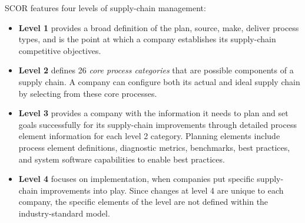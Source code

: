 \documentclass[11pt,a4paper]{article}
\begin{document}
SCOR features four levels of supply-chain management:
\begin{itemize}
\item \textbf{Level 1} provides a broad definition of the plan, source, make,
  deliver process types, and is the point at which a company establishes its
  supply-chain competitive objectives.
\item \textbf{Level 2} defines 26 \emph{core process categories} that are
  possible components of a supply chain. A company can configure both its
  actual and ideal supply chain by selecting from these core processes.
\item \textbf{Level 3} provides a company with the information it needs to
  plan and set goals successfully for its supply-chain improvements through
  detailed process element information for each level 2 category. Planning
  elements include process element definitions, diagnostic metrics,
  benchmarks, best practices, and system software capabilities to enable best
  practices.
\item \textbf{Level 4} focuses on implementation, when companies put specific
  supply-chain improvements into play. Since changes at level 4 are unique to
  each company, the specific elements of the level are not defined within the
  industry-standard model.
\end{itemize}
\end{document}
